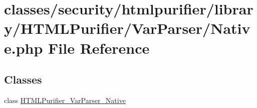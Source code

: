 \hypertarget{Native_8php}{\section{classes/security/htmlpurifier/library/\+H\+T\+M\+L\+Purifier/\+Var\+Parser/\+Native.php File Reference}
\label{Native_8php}
}
\subsection*{Classes}
\begin{DoxyCompactItemize}
\item 
class \hyperlink{classHTMLPurifier__VarParser__Native}{H\+T\+M\+L\+Purifier\+\_\+\+Var\+Parser\+\_\+\+Native}
\end{DoxyCompactItemize}
